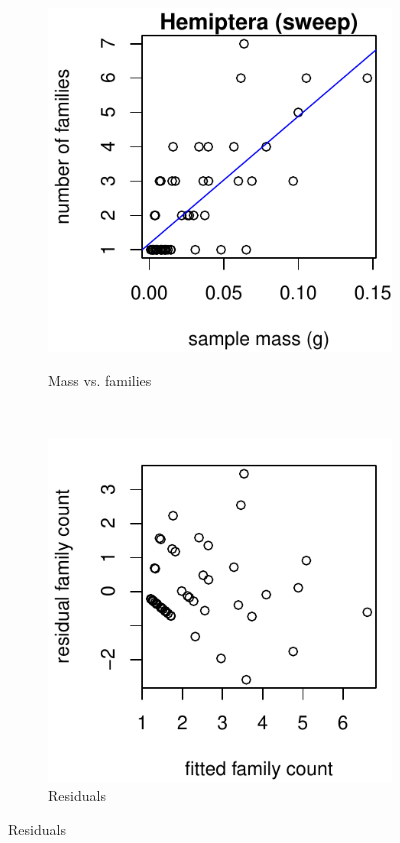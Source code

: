 \documentclass[10pt,letterpaper,twocolumn]{article}
\begin{document}
\begin{figure}[h]
	\centering
	\begin{subfigure}[b]{0.15\textwidth}
		\caption{Mass vs. families}
		\includegraphics[width=\textwidth]{plots/mass-vs-count/scatter/2015_sweep_Hemiptera_mass-vs-count.pdf}
		\label{fig:sweep_hemiptera_scatter}
	\end{subfigure}
	~
	\begin{subfigure}[b]{0.15\textwidth}
		\caption{Residuals}
		\includegraphics[width=\textwidth]{plots/mass-vs-count/residual/2015_sweep_Hemiptera_residual.pdf}

\end{subfigure}
\end{figure}
\end{document}
